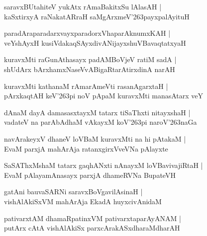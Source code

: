 \documentclass[twoside,12pt,openright]{book}
\def\S{\char'263}
\newcounter{shloka}[chapter]
\begin{document}
\begin{shloka}%
saravxBUtahiteV yukAtx rAmaBakitxSu lAlasAH |\\
kaSxtirxyA raNakatARraH saMgArxmeV\S payxpalAyituH
\end{shloka}

\begin{shloka}%
paradAraparadarxvayxparadorxVhaparAknumxKAH |\\
veYshAyxH kusiVdakaqSAyxdivANijayxshuVBavaqtatxyaH 
\end{shloka}

\begin{shloka}%
kuravxMti raGunAthasayx padAMBoVjeV ratiM sadA |\\
shUdArx bArxhamxNaseVvABigaRtarAtirxdinA narAH 
\end{shloka}

\begin{shloka}%
kuravxMti kathanaM rAmarAmeVti rasanAgarxtaH |\\
pArxkaqtAH keV\S pi noV pApaM kuravxMti manasAtarx veY
\end{shloka}

\begin{shloka}%
dAnaM dayA damasasxtayxM tatarx tiSaThxti nitayxshaH |\\
vadateV na parAbAdhaM vAkayxM koV\S pi naroV\S naGa 
\end{shloka}

\begin{shloka}%
navArakeyxV dhaneV loVBaM kuravxMti na hi pAtakaM |\\
EvaM parxjA mahArAja ratanxgirxVveVNa pAlayxte
\end{shloka}

\begin{shloka}%
SaSAThxMshaM tatarx gaqhANxti nAnayxM loVBavivajiRtaH |\\
EvaM pAlayamAnasayx parxjA dhameRVNa BupateVH 
\end{shloka}

\begin{shloka}%
gatAni bauvaSARNi saravxBoVgavilAsinaH |\\
vishAlAkiSxVM  mahArAja EkadA huyxcivAnidaM 
\end{shloka}

\begin{shloka}%
pativarxtAM dhamaRpatinxVM pativarxtaparAyANAM |\\
putArx cAtA vishAlAkiSx parxcArakASxdharaMdharAH 
\end{shloka}
\end{document}
